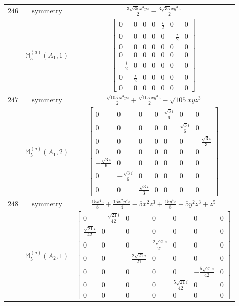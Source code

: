 \documentclass[fleqn,8pt,landscape]{jsarticle}
\begin{document}
\begin{longtable}{ccc}
$ 246 $ & $ \text{symmetry} $ & $ \frac{3 \sqrt{35} x^{3} y z}{2} - \frac{3 \sqrt{35} x y^{3} z}{2} $ \\
$  $ & $ \mathbb{M}_{5}^{(a)}(A_{1},1) $ & $ \begin{bmatrix} 0 & 0 & 0 & 0 & \frac{i}{2} & 0 & 0 \\ 0 & 0 & 0 & 0 & 0 & - \frac{i}{2} & 0 \\ 0 & 0 & 0 & 0 & 0 & 0 & 0 \\ 0 & 0 & 0 & 0 & 0 & 0 & 0 \\ - \frac{i}{2} & 0 & 0 & 0 & 0 & 0 & 0 \\ 0 & \frac{i}{2} & 0 & 0 & 0 & 0 & 0 \\ 0 & 0 & 0 & 0 & 0 & 0 & 0 \end{bmatrix} $ \\ \hline
$ 247 $ & $ \text{symmetry} $ & $ \frac{\sqrt{105} x^{3} y z}{2} + \frac{\sqrt{105} x y^{3} z}{2} - \sqrt{105} x y z^{3} $ \\
$  $ & $ \mathbb{M}_{5}^{(a)}(A_{1},2) $ & $ \begin{bmatrix} 0 & 0 & 0 & 0 & \frac{\sqrt{3} i}{6} & 0 & 0 \\ 0 & 0 & 0 & 0 & 0 & \frac{\sqrt{3} i}{6} & 0 \\ 0 & 0 & 0 & 0 & 0 & 0 & - \frac{\sqrt{3} i}{3} \\ 0 & 0 & 0 & 0 & 0 & 0 & 0 \\ - \frac{\sqrt{3} i}{6} & 0 & 0 & 0 & 0 & 0 & 0 \\ 0 & - \frac{\sqrt{3} i}{6} & 0 & 0 & 0 & 0 & 0 \\ 0 & 0 & \frac{\sqrt{3} i}{3} & 0 & 0 & 0 & 0 \end{bmatrix} $ \\ \hline
$ 248 $ & $ \text{symmetry} $ & $ \frac{15 x^{4} z}{8} + \frac{15 x^{2} y^{2} z}{4} - 5 x^{2} z^{3} + \frac{15 y^{4} z}{8} - 5 y^{2} z^{3} + z^{5} $ \\
$  $ & $ \mathbb{M}_{5}^{(a)}(A_{2},1) $ & $ \begin{bmatrix} 0 & - \frac{\sqrt{21} i}{42} & 0 & 0 & 0 & 0 & 0 \\ \frac{\sqrt{21} i}{42} & 0 & 0 & 0 & 0 & 0 & 0 \\ 0 & 0 & 0 & \frac{2 \sqrt{21} i}{21} & 0 & 0 & 0 \\ 0 & 0 & - \frac{2 \sqrt{21} i}{21} & 0 & 0 & 0 & 0 \\ 0 & 0 & 0 & 0 & 0 & - \frac{5 \sqrt{21} i}{42} & 0 \\ 0 & 0 & 0 & 0 & \frac{5 \sqrt{21} i}{42} & 0 & 0 \\ 0 & 0 & 0 & 0 & 0 & 0 & 0 \end{bmatrix} $ \\ \hline

\end{longtable}
\end{document}
